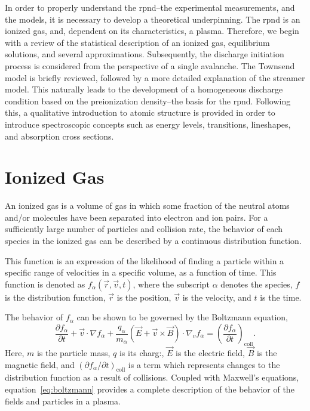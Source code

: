 In order to properly understand the \acs{rpnd}--the experimental measurements,
and the models, it is necessary to develop a theoretical underpinning. The
\acs{rpnd} is an ionized gas, and, dependent on its characteristics, a plasma.
Therefore, we begin with a review of the statistical description of an ionized
gas, equilibrium solutions, and several approximations. Subsequently, the
discharge initiation process is considered from the perspective of a single
avalanche. The Townsend model is briefly reviewed, followed by a more detailed
explanation of the streamer model. This naturally leads to the development of a
homogeneous discharge condition based on the preionization density--the basis
for the \acs{rpnd}. Following this, a qualitative introduction to atomic
structure is provided in order to introduce spectroscopic concepts such as
energy levels, transitions, lineshapes, and absorption cross sections.

\section{Ionized Gas}
An ionized gas is a volume of gas in which some fraction of the neutral atoms
and/or molecules have been separated into electron and ion pairs. For a
sufficiently large number of particles and collision rate, the behavior of each
species in the ionized gas can be described by a continuous distribution
function.

This function is an expression of the likelihood of finding a particle within a
specific range of velocities in a specific volume, as a function of time. This
function is denoted as $f_\alpha(\vec{r}, \vec{v}, t)$, where the subscript
$\alpha$ denotes the species, $f$ is the distribution function, $\vec{r}$ is the
position, $\vec{v}$ is the velocity, and $t$ is the time.

The behavior of $f_\alpha$ can be shown \cite{Bellan2008} to be governed by the
Boltzmann equation,
\begin{equation}\label{eq:boltzmann}
  \frac{\partial f_\alpha}{\partial t} + \vec{v}\cdot\nabla f_\alpha +
  \frac{q_\alpha}{m_\alpha} \left(\vec{E} + \vec{v}\times\vec{B}\right)
  \cdot \nabla_v f_\alpha = \left( \frac{\partial f_\alpha}
  {\partial t}\right)_\mathrm{coll}.
\end{equation}
Here, $m$ is the particle mass, $q$ is its charg:, $\vec{E}$ is the electric
field, $\vec{B}$ is the magnetic field, and $(\partial f_\alpha/\partial
t)_\mathrm{coll}$ is a term which represents changes to the distribution
function as a result of collisions. Coupled with Maxwell's equations,
equation~\ref{eq:boltzmann} provides a complete description of the behavior of
the fields and particles in a plasma.

